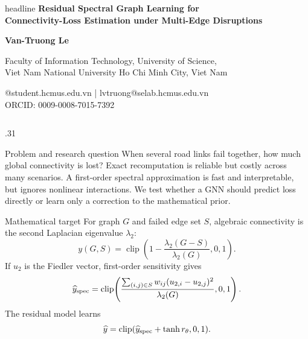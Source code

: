 \documentclass[final]{beamer}
\begin{document}
\begin{frame}[t]
\begin{beamercolorbox}[wd=\paperwidth,sep=2.1cm,center]{headline}
{\fontsize{60}{66}\selectfont\bfseries Residual Spectral Graph Learning for\\[.3ex]
Connectivity-Loss Estimation under Multi-Edge Disruptions}\par
\vspace{1.1cm}
{\fontsize{34}{39}\selectfont\bfseries Van-Truong Le}\par
\vspace{.5cm}
{\fontsize{25}{29}\selectfont Faculty of Information Technology, University of Science,\\
Viet Nam National University Ho Chi Minh City, Viet Nam}\par
\vspace{.5cm}
{\fontsize{22}{26}@student.hcmus.edu.vn \quad | \quad lvtruong@selab.hcmus.edu.vn}
\\[.35cm]
{\fontsize{20}{24}\selectfont ORCID: 0009-0008-7015-7392}
\end{beamercolorbox}

\vspace{1.2cm}
\begin{columns}[t,totalwidth=.96\paperwidth]
\begin{column}{.31\paperwidth}
\begin{block}{Problem and research question}
When several road links fail together, how much global connectivity is lost?
Exact recomputation is reliable but costly across many scenarios. A first-order
spectral approximation is fast and interpretable, but ignores nonlinear
interactions. We test whether a GNN should predict loss directly or learn only a
correction to the mathematical prior.
\end{block}

\begin{block}{Mathematical target}
For graph $G$ and failed edge set $S$, algebraic connectivity is the second
Laplacian eigenvalue $\lambda_2$:
\[
y(G,S)=\operatorname{clip}\!\left(1-\frac{\lambda_2(G-S)}{\lambda_2(G)},0,1\right).
\]
If $u_2$ is the Fiedler vector, first-order sensitivity gives
\[
\widehat y_{\rm spec}=\operatorname{clip}\!\left(
\frac{\sum_{(i,j)\in S}w_{ij}(u_{2,i}-u_{2,j})^2}{\lambda_2(G)},0,1\right).
\]
The residual model learns
\[
\widehat y=\operatorname{clip}(\widehat y_{\rm spec}+\tanh r_\theta,0,1).
\]
\end{block}


\end{column}
\end{columns}
\end{frame}
\end{document}
